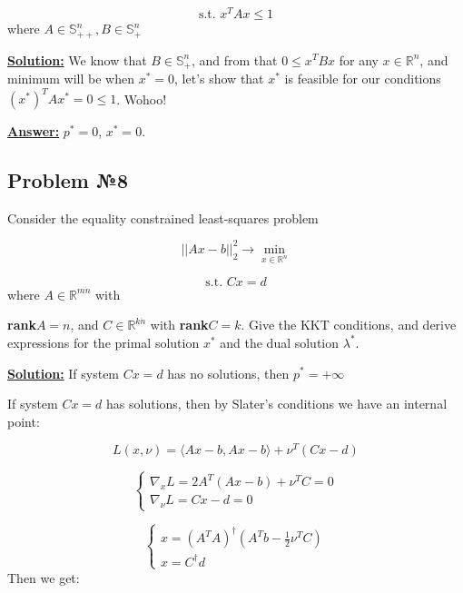 \begin{equation*}
   \text{s.t. } x^TAx \leq 1
\end{equation*}
where $A \in \mathds{S}_{++}^n, B \in \mathds{S}_+^n$

\underline{\textbf{Solution:}}
We know that $B \in \mathds{S}_+^n$, and from that $0 \leq x^TBx$ for any $x \in \mathds{R}^n$, and minimum will be when $x^* = 0$, let's show that $x^*$ is feasible for our conditions $(x^*)^TAx^* = 0 \leq 1$. 
Wohoo!

\underline{\textbf{Answer:}} $p^* = 0$, $x^* = 0$.

\subsection{Problem №8}
Consider the equality constrained least-squares problem 

\begin{equation*}
    ||Ax-b||_2^2  \xrightarrow{} \min\limits_{x \in \mathds{R}^n}
\end{equation*}

\begin{equation*}
   \text{s.t. } Cx = d
\end{equation*}
where $A \in \mathds{R}^{m \dot n}$ with 

\textbf{rank}$A = n$, and $C \in \mathds{R}^{k \dot n}$ with \textbf{rank}$C = k$. Give the KKT conditions, and derive expressions for the primal solution $x^*$ and the dual solution $\lambda^*$.

\underline{\textbf{Solution:}}
If system $Cx = d$ has no solutions, then $p^* = +\infty$

If system $Cx = d$ has solutions, then by Slater's conditions we have an internal point:

\begin{equation*}
    L(x, \nu) = \langle Ax - b, Ax -b \rangle + \nu^T(Cx-d)
\end{equation*}

\begin{equation*}
    \begin{cases}
    \nabla_x L = 2A^T(Ax-b) + \nu^TC = 0 \\ 
    \nabla_{\nu} L = Cx - d= 0
    \end{cases}
\end{equation*}

\begin{equation*}
    \begin{cases}
    x = (A^TA)^{\dag}(A^Tb - \frac{1}{2}\nu^TC) \\
    x = C^{\dag}d
    \end{cases}
\end{equation*}
Then we get: 

